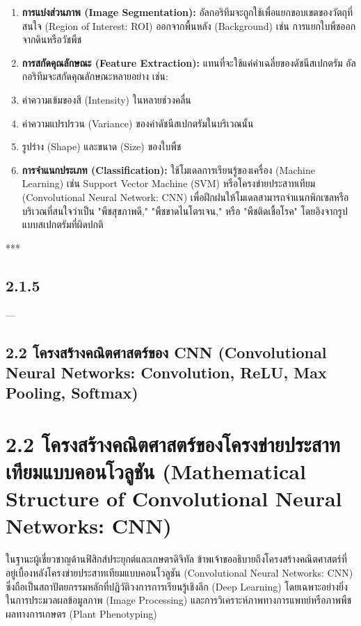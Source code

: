 \documentclass[11pt,a4paper,openany]{report}
\begin{document}
\begin{enumerate}
  \item \textbf{การแบ่งส่วนภาพ (Image Segmentation):} อัลกอริทึมจะถูกใช้เพื่อแยกขอบเขตของวัตถุที่สนใจ (Region of Interest: ROI) ออกจากพื้นหลัง (Background) เช่น การแยกใบพืชออกจากดินหรือวัชพืช
  \item \textbf{การสกัดคุณลักษณะ (Feature Extraction):} แทนที่จะใช้แค่ค่าเฉลี่ยของดัชนีสเปกตรัม อัลกอริทึมจะสกัดคุณลักษณะหลายอย่าง เช่น:
  \item ค่าความเข้มของสี (Intensity) ในหลายช่วงคลื่น
  \item ค่าความแปรปรวน (Variance) ของค่าดัชนีสเปกตรัมในบริเวณนั้น
  \item รูปร่าง (Shape) และขนาด (Size) ของใบพืช
  \item \textbf{การจำแนกประเภท (Classification):} ใช้โมเดลการเรียนรู้ของเครื่อง (Machine Learning) เช่น Support Vector Machine (SVM) หรือโครงข่ายประสาทเทียม (Convolutional Neural Network: CNN) เพื่อฝึกฝนให้โมเดลสามารถจำแนกพิกเซลหรือบริเวณที่สนใจว่าเป็น "พืชสุขภาพดี," "พืชขาดไนโตรเจน," หรือ "พืชติดเชื้อโรค" โดยอิงจากรูปแบบสเปกตรัมที่ผิดปกติ
\end{enumerate}


***

\section{2.1.5}



---

\section{2.2 โครงสร้างคณิตศาสตร์ของ CNN (Convolutional Neural Networks: Convolution, ReLU, Max Pooling, Softmax)}


\chapter{2.2 โครงสร้างคณิตศาสตร์ของโครงข่ายประสาทเทียมแบบคอนโวลูชัน (Mathematical Structure of Convolutional Neural Networks: CNN)}


ในฐานะผู้เชี่ยวชาญด้านฟิสิกส์ประยุกต์และเกษตรดิจิทัล ข้าพเจ้าขออธิบายถึงโครงสร้างคณิตศาสตร์ที่อยู่เบื้องหลังโครงข่ายประสาทเทียมแบบคอนโวลูชัน (Convolutional Neural Networks: CNN) ซึ่งถือเป็นสถาปัตยกรรมหลักที่ปฏิวัติวงการการเรียนรู้เชิงลึก (Deep Learning) โดยเฉพาะอย่างยิ่งในการประมวลผลข้อมูลภาพ (Image Processing) และการวิเคราะห์ภาพทางการแพทย์หรือภาพพืชผลทางการเกษตร (Plant Phenotyping)
\end{document}
